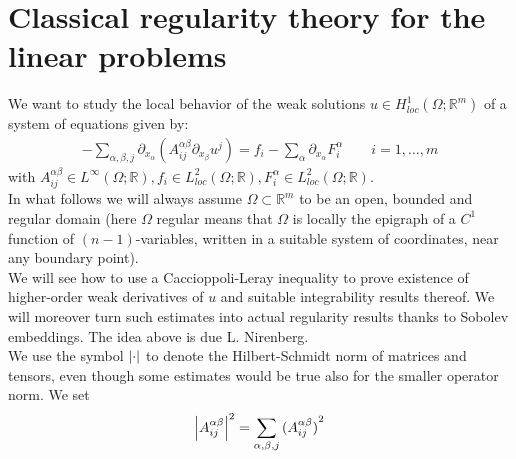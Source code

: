\section{Classical regularity theory for the linear problems}
We want to study the local behavior of the weak solutions \(u \in H_{loc}^{1}(\Omega; \mathbb{R}^{m})\) of a system of equations given by:
\begin{gather}
	- \sum_{\alpha, \beta, j} \partial_{x_\alpha} (A_{ij}^{\alpha \beta} \partial_{x_{\beta}} u^{j}) = f_{i} - \sum_{\alpha}^{} \partial_{x_{\alpha}} F_{i}^{\alpha}\qquad i=1,\dots,m
\end{gather}
with \(A_{ij}^{\alpha \beta} \in L^{\infty}(\Omega;\mathbb{R}), f_{i}\in L^{2}_{loc}(\Omega;\mathbb{R}), F_{i}^{\alpha}\in L_{loc}^{2}(\Omega;\mathbb{R})\).\\
In what follows we will always assume \(\Omega \subset \mathbb{R}^{m}\) to be an open, bounded and regular domain (here \(\Omega \) regular means that \(\Omega \) is locally the epigraph of a \(C^{1}\) function of \((n-1)\)-variables, written in a suitable system of coordinates, near any boundary point).\\
We will see how to use a Caccioppoli-Leray inequality to prove existence of higher-order weak derivatives of \(u\) and suitable integrability results thereof. We will moreover turn such estimates into actual regularity results thanks to Sobolev embeddings. The idea above is due L. Nirenberg.\\
We use the symbol \(\abs{\cdot}\) to denote the Hilbert-Schmidt norm of matrices and tensors, even though some estimates would be true also for the smaller operator norm.
We set
\begin{gather}
	\abs{A_{ij}^{\alpha \beta}}^{2} = \sum_{\alpha, \beta, j}  {(A_{ij}^{\alpha \beta})}^{2}
\end{gather}

